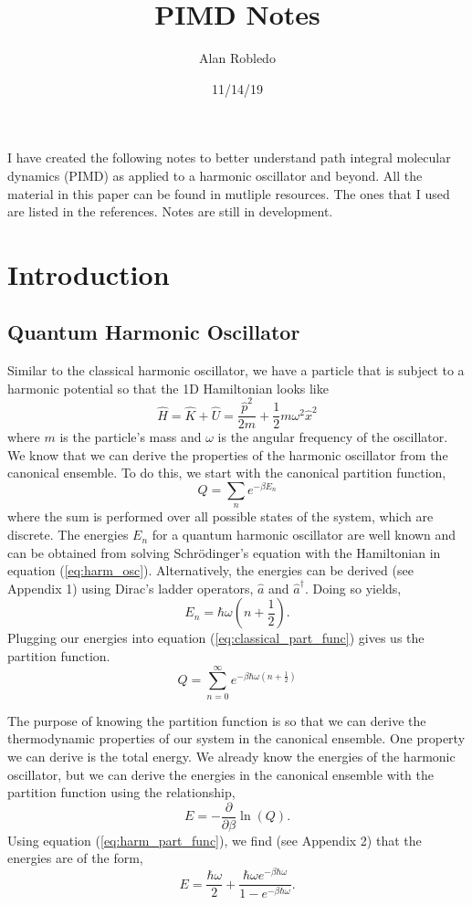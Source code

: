 \documentclass{article}
\title{PIMD Notes}
\date{11/14/19}
\author{Alan Robledo}
\newcommand{\be}{\begin{equation}}
\newcommand{\ee}{\end{equation}}
\begin{document}
\maketitle

I have created the following notes to better understand path integral molecular dynamics (PIMD) as applied to a harmonic oscillator and beyond. All the material in this paper can be found in mutliple resources. The ones that I used are listed in the references. Notes are still in development.

\section{Introduction}
\subsection{Quantum Harmonic Oscillator}
Similar to the classical harmonic oscillator, we have a particle that is subject to a harmonic potential so that the 1D Hamiltonian looks like
\be \label{eq:harm_osc}
  \hat{H} = \hat{K} + \hat{U} = \frac{\hat{p}^2}{2m} + \frac{1}{2}m \omega^2\hat{x}^2
\ee
where $m$ is the particle's mass and $\omega$ is the angular frequency of the oscillator.
We know that we can derive the properties of the harmonic oscillator from the canonical ensemble. To do this, we start with the canonical partition function,
\be \label{eq:classical_part_func}
  Q = \sum_n e^{-\beta E_n}
\ee
where the sum is performed over all possible states of the system, which are discrete.\cite{tuckerman}
The energies $E_n$ for a quantum harmonic oscillator are well known and can be obtained from solving Schr\"odinger's equation with the Hamiltonian in equation (\ref{eq:harm_osc}).
Alternatively, the energies can be derived (see Appendix 1) using Dirac's ladder operators, $\hat{a}$ and $\hat{a}^{\dagger}$.\cite{griffiths,shankar}
Doing so yields,
\be
  E_n = \hbar \omega(n + \frac{1}{2}) .
\ee
Plugging our energies into equation (\ref{eq:classical_part_func}) gives us the partition function.
\be \label{eq:harm_part_func}
  Q = \sum_{n=0}^{\infty} e^{-\beta \hbar \omega(n + \frac{1}{2})}
\ee

The purpose of knowing the partition function is so that we can derive the thermodynamic properties of our system in the canonical ensemble. One property we can derive is the total energy. We already know the energies of the harmonic oscillator, but we can derive the energies in the canonical ensemble with the partition function using the relationship,
\be
  E = - \frac{\partial}{\partial \beta} \ln(Q) .
\ee
Using equation (\ref{eq:harm_part_func}), we find (see Appendix 2) that the energies are of the form,
\be \label{eq:canonical_energies}
  E = \frac{\hbar \omega}{2} + \frac{\hbar \omega e^{-\beta \hbar \omega}}{1-e^{-\beta \hbar \omega}}.
\ee
\end{document}
